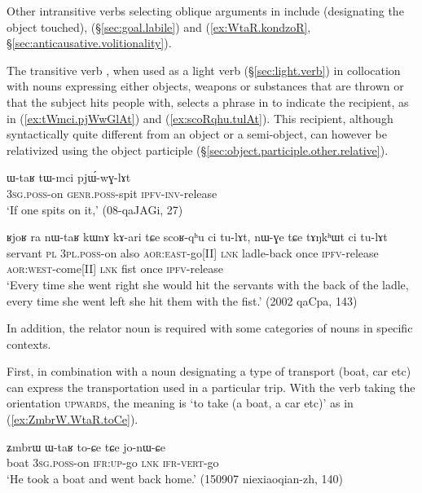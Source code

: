 Other intransitive verbs selecting oblique arguments in  include  (designating the object touched),  (§\ref{sec:goal.labile}) and  (\ref{ex:WtaR.kondzoR}, §\ref{sec:anticausative.volitionality}).

The transitive verb , when used as a light verb (§\ref{sec:light.verb}) in collocation with nouns expressing either objects, weapons or substances that are thrown or that the subject hits people with, selects a phrase in  to indicate the recipient, as in (\ref{ex:tWmci.pjWwGlAt}) and (\ref{ex:scoRqhu.tulAt}). This recipient, although syntactically quite different from an object or a semi-object, can however be relativized using the object participle (§\ref{sec:object.participle.other.relative}).

\begin{exe}
\ex \label{ex:tWmci.pjWwGlAt}
\gll ɯ-taʁ tɯ-mci pjɯ́-wɣ-lɤt \\
\textsc{3sg}.\textsc{poss}-on \textsc{genr}.\textsc{poss}-spit \textsc{ipfv}-\textsc{inv}-release \\
\glt `If one spits on it,' (08-qaJAGi, 27)
\end{exe}

\begin{exe}
\ex \label{ex:scoRqhu.tulAt}
\gll ʁjoʁ ra nɯ-taʁ kɯnɤ kɤ-ari tɕe scoʁ-qʰu ci tu-lɤt, nɯ-ɣe tɕe tɤŋkʰɯt ci tu-lɤt \\
servant \textsc{pl} \textsc{3pl}.\textsc{poss}-on also \textsc{aor}:\textsc{east}-go[II] \textsc{lnk} ladle-back once \textsc{ipfv}-release \textsc{aor}:\textsc{west}-come[II] \textsc{lnk} fist once \textsc{ipfv}-release \\
\glt `Every time she went right she would hit the servants with the back of the ladle, every time she went left she hit them with the fist.' (2002 qaCpa, 143)
\end{exe} 

In addition, the relator noun  is required with some categories of nouns in specific contexts.

First,  in combination with a noun designating a type of transport (boat, car etc) can express the transportation used in a particular trip. With the verb  taking the orientation \textsc{upwards}, the meaning is `to take (a boat, a car etc)' as in (\ref{ex:ZmbrW.WtaR.toCe}). 

\begin{exe}
\ex \label{ex:ZmbrW.WtaR.toCe}
\gll ʑmbrɯ ɯ-taʁ to-ɕe tɕe jo-nɯ-ɕe \\
boat \textsc{3sg}.\textsc{poss}-on \textsc{ifr}:\textsc{up}-go \textsc{lnk} \textsc{ifr}-\textsc{vert}-go \\
\glt `He took a boat and went back home.' (150907 niexiaoqian-zh, 140)
\end{exe} 


